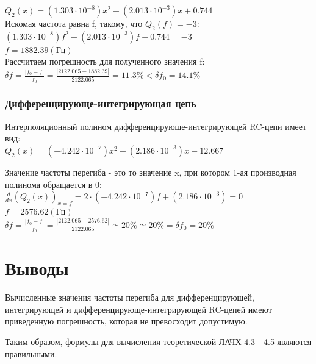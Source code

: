 $Q_2(x) = (1.303 \cdot 10^{-8})x^2 - (2.013 \cdot 10^{-3})x + 0.744$\\

Искомая частота равна f, такому, что $Q_2(f) = -3$:\\

$(1.303 \cdot 10^{-8})f^2 - (2.013 \cdot 10^{-3})f + 0.744 = -3$\\

$f = 1882.39 (\text{Гц})$\\

Рассчитаем погрешность для полученного значения f:\\

$\delta f = \frac{|f_0 - f|}{f_0} = \frac{|2122.065 - 1882.39|}{2122.065} = 11.3 \% < \delta f_0 = 14.1\%$

\subsubsection{Дифференцирующе-интегрирующая цепь}
Интерполяционный полином дифференцирующе-интегрирующей RC-цепи имеет вид:\\

$Q_2(x) = (-4.242 \cdot 10^{-7})x^2 + (2.186 \cdot 10^{-3})x -12.667$

Значение частоты перегиба - это то значение x, при котором 1-ая производная полинома обращается в 0:\\

$\frac{d}{dx} (Q_2(x))_{x=f} = 2 \cdot (-4.242 \cdot 10^{-7})f + (2.186 \cdot 10^{-3}) = 0$\\

$f = 2576.62 (\text{Гц})$\\

$\delta f = \frac{|f_0 - f|}{f_0} = \frac{|2122.065 - 2576.62|}{2122.065} \simeq 20 \% \simeq 20 \% = \delta f_0 = 20\%$
  
\section{Выводы}
Вычисленные значения частоты перегиба для дифференцирующей, интегрирующей и дифференцирующе-интегрирующей RC-цепей имеют приведенную погрешность, которая не превосходит допустимую. 

Таким образом, формулы для вычисления теоретической ЛАЧХ 4.3 - 4.5 являются правильными.

